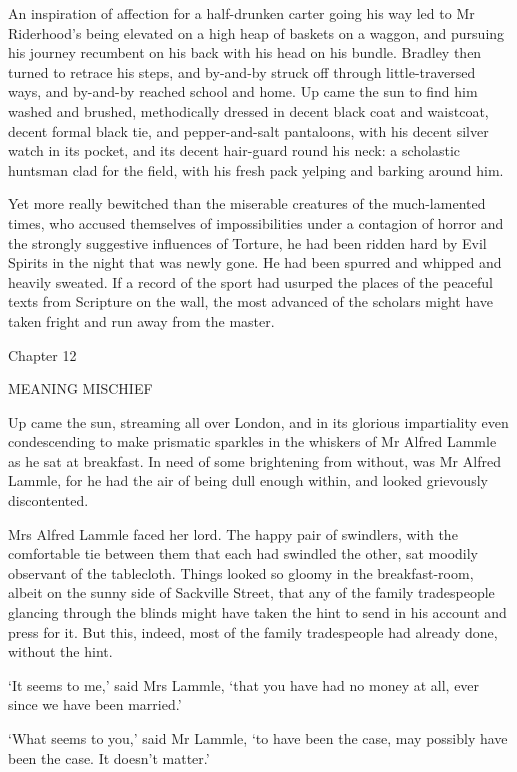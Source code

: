 An inspiration of affection for a half-drunken carter going his way led
to Mr Riderhood’s being elevated on a high heap of baskets on a waggon,
and pursuing his journey recumbent on his back with his head on his
bundle. Bradley then turned to retrace his steps, and by-and-by struck
off through little-traversed ways, and by-and-by reached school and
home. Up came the sun to find him washed and brushed, methodically
dressed in decent black coat and waistcoat, decent formal black tie, and
pepper-and-salt pantaloons, with his decent silver watch in its pocket,
and its decent hair-guard round his neck: a scholastic huntsman clad for
the field, with his fresh pack yelping and barking around him.

Yet more really bewitched than the miserable creatures of the
much-lamented times, who accused themselves of impossibilities under a
contagion of horror and the strongly suggestive influences of Torture,
he had been ridden hard by Evil Spirits in the night that was newly
gone. He had been spurred and whipped and heavily sweated. If a record
of the sport had usurped the places of the peaceful texts from Scripture
on the wall, the most advanced of the scholars might have taken fright
and run away from the master.



Chapter 12

MEANING MISCHIEF


Up came the sun, streaming all over London, and in its glorious
impartiality even condescending to make prismatic sparkles in the
whiskers of Mr Alfred Lammle as he sat at breakfast. In need of some
brightening from without, was Mr Alfred Lammle, for he had the air of
being dull enough within, and looked grievously discontented.

Mrs Alfred Lammle faced her lord. The happy pair of swindlers, with
the comfortable tie between them that each had swindled the other, sat
moodily observant of the tablecloth. Things looked so gloomy in the
breakfast-room, albeit on the sunny side of Sackville Street, that any
of the family tradespeople glancing through the blinds might have taken
the hint to send in his account and press for it. But this, indeed, most
of the family tradespeople had already done, without the hint.

‘It seems to me,’ said Mrs Lammle, ‘that you have had no money at all,
ever since we have been married.’

‘What seems to you,’ said Mr Lammle, ‘to have been the case, may
possibly have been the case. It doesn’t matter.’

